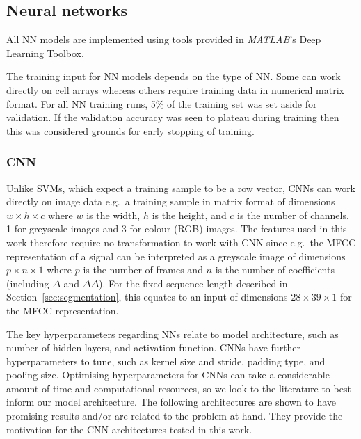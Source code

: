 \subsection{Neural networks}

All NN models are implemented using tools provided in \textit{MATLAB}'s Deep
Learning Toolbox.

The training input for NN models depends on the type of NN\@. Some can work
directly on cell arrays whereas others require training data in numerical matrix
format. For all NN training runs, 5\% of the training set was set aside for
validation. If the validation accuracy was seen to plateau during training then
this was considered grounds for early stopping of training.

\subsubsection{CNN}\label{sssec:method:cnn}

Unlike SVMs, which expect a training sample to be a row vector, CNNs can work
directly on image data e.g.\ a training sample in matrix format of dimensions
$w \times h \times c$ where $w$ is the width, $h$ is the height, and $c$ is the
number of channels, 1 for greyscale images and 3 for colour (RGB) images. The
features used in this work therefore require no transformation to work with CNN
since e.g.\ the MFCC representation of a signal can be interpreted as a
greyscale image of dimensions $p \times n \times 1$ where $p$ is the number of
frames and $n$ is the number of coefficients (including $\Delta$ and
$\Delta\Delta$). For the fixed sequence length described in
Section~\ref{sec:segmentation}, this equates to an input of dimensions $28
\times 39 \times 1$ for the MFCC representation.

The key hyperparameters regarding NNs relate to model architecture, such as
number of hidden layers, and activation function. CNNs have further
hyperparameters to tune, such as kernel size and stride, padding type, and
pooling size. Optimising hyperparameters for CNNs can take a
considerable amount of time and computational resources, so we look to the
literature to best inform our model architecture. The following architectures are
shown to have promising results and/or are related to the problem at hand. They
provide the motivation for the CNN architectures tested in this work.

